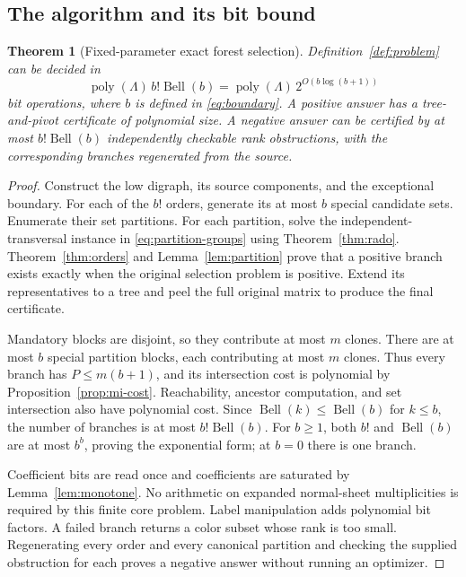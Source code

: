 \documentclass[11pt,letterpaper]{article}
\newtheorem{theorem}{Theorem}[section]
\theoremstyle{definition}
\theoremstyle{remark}
\DeclareMathOperator{\Bell}{Bell}
\DeclareMathOperator{\poly}{poly}
\begin{document}
\subsection{The algorithm and its bit bound}
\begin{theorem}[Fixed-parameter exact forest selection]\label{thm:fpt}
Definition~\ref{def:problem} can be decided in
\begin{equation}\label{eq:fpt}
 \poly(\Lambda)\,b!\Bell(b)
 =\poly(\Lambda)\,2^{O(b\log(b+1))}
\end{equation}
bit operations, where $b$ is defined in \eqref{eq:boundary}. A positive answer
has a tree-and-pivot certificate of polynomial size. A negative answer can be
certified by at most $b!\Bell(b)$ independently checkable rank obstructions,
with the corresponding branches regenerated from the source.
\end{theorem}
\begin{proof}
Construct the low digraph, its source components, and the exceptional boundary.
For each of the $b!$ orders, generate its at most $b$ special candidate sets.
Enumerate their set partitions. For each partition, solve the independent-
transversal instance in \eqref{eq:partition-groups} using
Theorem~\ref{thm:rado}. Theorem~\ref{thm:orders} and
Lemma~\ref{lem:partition} prove that a positive branch exists exactly when the
original selection problem is positive. Extend its representatives to a tree
and peel the full original matrix to produce the final certificate.

Mandatory blocks are disjoint, so they contribute at most $m$ clones. There are
at most $b$ special partition blocks, each contributing at most $m$ clones.
Thus every branch has $P\le m(b+1)$, and its intersection cost is polynomial
by Proposition~\ref{prop:mi-cost}. Reachability, ancestor computation, and set
intersection also have polynomial cost. Since $\Bell(k)\le\Bell(b)$ for
$k\le b$, the number of branches is at most $b!\Bell(b)$. For $b\ge1$, both
$b!$ and $\Bell(b)$ are at most $b^b$, proving the exponential form; at $b=0$
there is one branch.

Coefficient bits are read once and coefficients are saturated by
Lemma~\ref{lem:monotone}. No arithmetic on expanded normal-sheet multiplicities
is required by this finite core problem. Label manipulation adds polynomial bit
factors. A failed branch returns a color subset whose rank is too small.
Regenerating every order and every canonical partition and checking the supplied
obstruction for each proves a negative answer without running an optimizer.
\end{proof}
\end{document}
